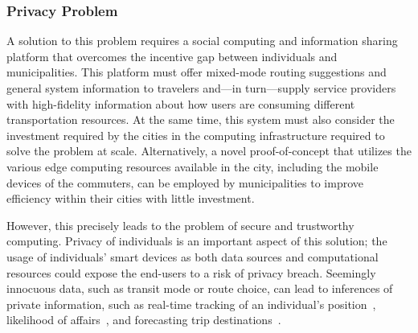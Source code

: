 \documentclass[12pt,letterpaper]{article}
\begin{document}
\subsubsection{Privacy Problem}
A solution to this problem requires a social computing and information sharing platform that overcomes the incentive gap between individuals and municipalities. This platform must offer mixed-mode routing suggestions and general system information to travelers and---in turn---supply service providers with high-fidelity information about how users are consuming different transportation resources. At the same time, this system must also consider the investment required by the cities in the computing infrastructure required to solve the problem at scale. Alternatively, a novel proof-of-concept that utilizes the various edge computing resources available in the city, including the mobile devices of the commuters, can be employed by municipalities to improve efficiency within their cities with little investment.

However, this precisely leads to the problem of secure and trustworthy computing.  Privacy of individuals is an important aspect of this solution; the usage of individuals' smart devices as both data sources and computational resources  could expose the end-users to a risk of privacy breach. Seemingly innocuous data, such as transit mode or route choice, can lead to inferences of
private information, such as real-time tracking of an individual's position~\cite{koufogiannis:2015aa}, likelihood of affairs~\cite{mueffelmann:2015aa}, and forecasting trip destinations~\cite{dewri:2013aa}.


\clearpage


\end{document}
